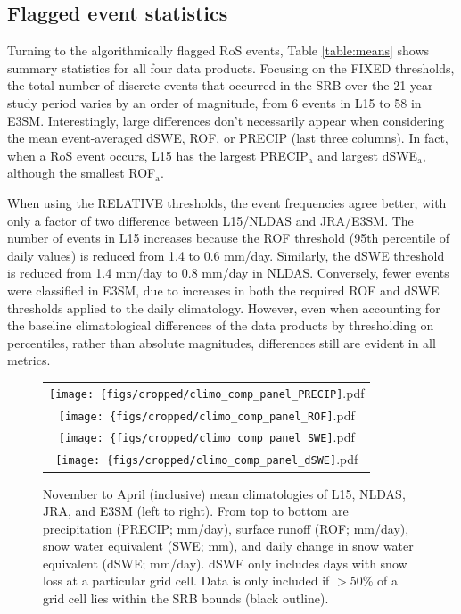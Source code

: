 \documentclass[nhess, manuscript]{copernicus}
\begin{document}
\subsection{Flagged event statistics}

Turning to the algorithmically flagged RoS events, Table \ref{table:means} shows summary statistics for all four data products.
Focusing on the FIXED thresholds, the total number of discrete events that occurred in the SRB over the 21-year study period varies by an order of magnitude, from 6 events in L15 to 58 in E3SM.
Interestingly, large differences don't necessarily appear when considering the mean event-averaged dSWE, ROF, or PRECIP (last three columns).
In fact, when a RoS event occurs, L15 has the largest PRECIP$_\textrm{a}$ and largest dSWE$_\textrm{a}$, although the smallest ROF$_\textrm{a}$.

When using the RELATIVE thresholds, the event frequencies agree better, with only a factor of two difference between L15/NLDAS and JRA/E3SM.
The number of events in L15 increases because the ROF threshold (95th percentile of daily values) is reduced from 1.4 to 0.6 mm/day.
Similarly, the dSWE threshold is reduced from 1.4 mm/day to 0.8 mm/day in NLDAS.
Conversely, fewer events were classified in E3SM, due to increases in both the required ROF and dSWE thresholds applied to the daily climatology.
However, even when accounting for the baseline climatological differences of the data products by thresholding on percentiles, rather than absolute magnitudes, differences still are evident in all metrics.

\begin{figure}
\begin{tabular}{c}
\texttt{[image: \{figs/cropped/climo\_comp\_panel\_PRECIP]}.pdf} \\
\texttt{[image: \{figs/cropped/climo\_comp\_panel\_ROF]}.pdf} \\
\texttt{[image: \{figs/cropped/climo\_comp\_panel\_SWE]}.pdf} \\
\texttt{[image: \{figs/cropped/climo\_comp\_panel\_dSWE]}.pdf}
\end{tabular}
\caption{November to April (inclusive) mean climatologies of L15, NLDAS, JRA, and E3SM (left to right). From top to bottom are precipitation (PRECIP; mm/day), surface runoff (ROF; mm/day), snow water equivalent (SWE; mm), and daily change in snow water equivalent (dSWE; mm/day). dSWE only includes days with snow loss at a particular grid cell. Data is only included if $>$50\% of a grid cell lies within the SRB bounds (black outline).}
\label{fig:means}
\end{figure}
\end{document}
